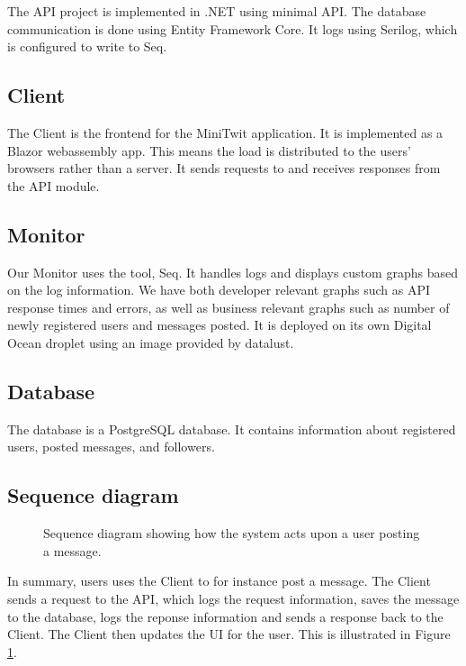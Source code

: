 The API project is implemented in .NET using minimal API.
The database communication is done using Entity Framework Core.
It logs using Serilog\cite{serilog}, 
which is configured to write to Seq\cite{seq}.

\subsection{Client}

The Client is the frontend for the MiniTwit application.
It is implemented as a Blazor webassembly app.
This means the load is distributed to the users' browsers 
rather than a server.
It sends requests to and receives responses from the API module.

\subsection{Monitor}

Our Monitor uses the tool, Seq\cite{seq}.
It handles logs and displays custom graphs based on 
the log information. We have both developer relevant 
graphs such as API response times and errors,
as well as business relevant graphs such as number 
of newly registered users and messages posted.
It is deployed on its own Digital Ocean droplet 
using an image provided by datalust\cite{seq}.

\subsection{Database}

The database is a PostgreSQL\cite{postgres} database.
It contains information about registered users,
posted messages, and followers.

\subsection{Sequence diagram}

\begin{figure}[H]
    \centering
    
    \caption{Sequence diagram showing how the system acts upon 
    a user posting a message.}
    \label{fig:seq_diagram}
\end{figure}

In summary, users uses the Client to for instance post a message.
The Client sends a request to the API, which logs the request 
information, saves the message to the database, 
logs the reponse information and sends a response back to the 
Client. The Client then updates the UI for the user.
This is illustrated in Figure \ref{fig:seq_diagram}.
